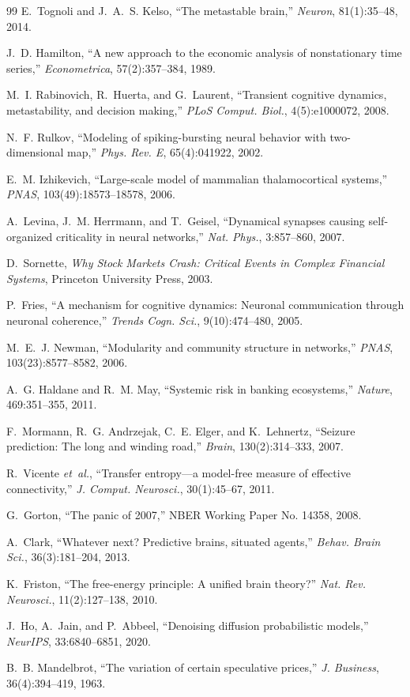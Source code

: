 \documentclass[12pt,twocolumn]{ltjsarticle}
\begin{document}
\begin{thebibliography}{99}
E.~Tognoli and J.~A.~S. Kelso,
``The metastable brain,''
\textit{Neuron}, 81(1):35--48, 2014.

J.~D. Hamilton,
``A new approach to the economic analysis of nonstationary time series,''
\textit{Econometrica}, 57(2):357--384, 1989.

M.~I. Rabinovich, R.~Huerta, and G.~Laurent,
``Transient cognitive dynamics, metastability, and decision making,''
\textit{PLoS Comput. Biol.}, 4(5):e1000072, 2008.

N.~F. Rulkov,
``Modeling of spiking-bursting neural behavior with
two-dimensional map,''
\textit{Phys. Rev. E}, 65(4):041922, 2002.

E.~M. Izhikevich,
``Large-scale model of mammalian thalamocortical systems,''
\textit{PNAS}, 103(49):18573--18578, 2006.

A.~Levina, J.~M. Herrmann, and T.~Geisel,
``Dynamical synapses causing self-organized criticality in neural networks,''
\textit{Nat. Phys.}, 3:857--860, 2007.

D.~Sornette,
\textit{Why Stock Markets Crash: Critical Events
in Complex Financial Systems},
Princeton University Press, 2003.

P.~Fries,
``A mechanism for cognitive dynamics:
Neuronal communication through neuronal coherence,''
\textit{Trends Cogn. Sci.}, 9(10):474--480, 2005.

M.~E.~J. Newman,
``Modularity and community structure in networks,''
\textit{PNAS}, 103(23):8577--8582, 2006.

A.~G. Haldane and R.~M. May,
``Systemic risk in banking ecosystems,''
\textit{Nature}, 469:351--355, 2011.

F.~Mormann, R.~G. Andrzejak, C.~E. Elger, and K.~Lehnertz,
``Seizure prediction: The long and winding road,''
\textit{Brain}, 130(2):314--333, 2007.

R.~Vicente \textit{et~al.},
``Transfer entropy---a model-free measure of effective connectivity,''
\textit{J. Comput. Neurosci.}, 30(1):45--67, 2011.

G.~Gorton,
``The panic of 2007,''
NBER Working Paper No. 14358, 2008.

A.~Clark,
``Whatever next? Predictive brains, situated agents,''
\textit{Behav. Brain Sci.}, 36(3):181--204, 2013.

K.~Friston,
``The free-energy principle: A unified brain theory?''
\textit{Nat. Rev. Neurosci.}, 11(2):127--138, 2010.

J.~Ho, A.~Jain, and P.~Abbeel,
``Denoising diffusion probabilistic models,''
\textit{NeurIPS}, 33:6840--6851, 2020.

B.~B. Mandelbrot,
``The variation of certain speculative prices,''
\textit{J. Business}, 36(4):394--419, 1963.

\end{thebibliography}
\end{document}
